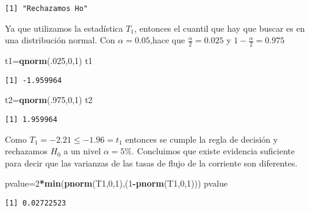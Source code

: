 \documentclass[a4paper,oneside,openany]{book}
\newenvironment{Shaded}{\begin{snugshade}}{\end{snugshade}}
\newcommand{\KeywordTok}[1]{\textcolor[rgb]{0.13,0.29,0.53}{\textbf{#1}}}
\newcommand{\DecValTok}[1]{\textcolor[rgb]{0.00,0.00,0.81}{#1}}
\newcommand{\OperatorTok}[1]{\textcolor[rgb]{0.81,0.36,0.00}{\textbf{#1}}}
\newcommand{\NormalTok}[1]{#1}
\begin{document}
\begin{verbatim}
[1] "Rechazamos Ho"
\end{verbatim}

Ya que utilizamos la estadística \(T_1\), entonces el cuantil que hay
que buscar es en una distribución normal. Con \(\alpha=0.05\),hace que
\(\frac{\alpha}{2}=0.025\) y \(1-\frac{\alpha}{2}=0.975\)

\begin{Shaded}
\begin{Highlighting}[]
\NormalTok{t1=}\KeywordTok{qnorm}\NormalTok{(.}\DecValTok{025}\NormalTok{,}\DecValTok{0}\NormalTok{,}\DecValTok{1}\NormalTok{)}
\NormalTok{t1}
\end{Highlighting}
\end{Shaded}

\begin{verbatim}
[1] -1.959964
\end{verbatim}

\begin{Shaded}
\begin{Highlighting}[]
\NormalTok{t2=}\KeywordTok{qnorm}\NormalTok{(.}\DecValTok{975}\NormalTok{,}\DecValTok{0}\NormalTok{,}\DecValTok{1}\NormalTok{)}
\NormalTok{t2}
\end{Highlighting}
\end{Shaded}

\begin{verbatim}
[1] 1.959964
\end{verbatim}

Como \(T_1=-2.21\leq -1.96 =t_1\) entonces se cumple la regla de
decisión y rechazamos \(H_0\) a un nivel \(\alpha=5\%\). Concluimos que
existe evidencia suficiente para decir que las varianzas de las tasas de
flujo de la corriente son diferentes.

\begin{Shaded}
\begin{Highlighting}[]
\NormalTok{pvalue=}\DecValTok{2}\OperatorTok{*}\KeywordTok{min}\NormalTok{(}\KeywordTok{pnorm}\NormalTok{(T1,}\DecValTok{0}\NormalTok{,}\DecValTok{1}\NormalTok{),(}\DecValTok{1}\OperatorTok{-}\KeywordTok{pnorm}\NormalTok{(T1,}\DecValTok{0}\NormalTok{,}\DecValTok{1}\NormalTok{)))}
\NormalTok{pvalue}
\end{Highlighting}
\end{Shaded}

\begin{verbatim}
[1] 0.02722523
\end{verbatim}
\end{document}
